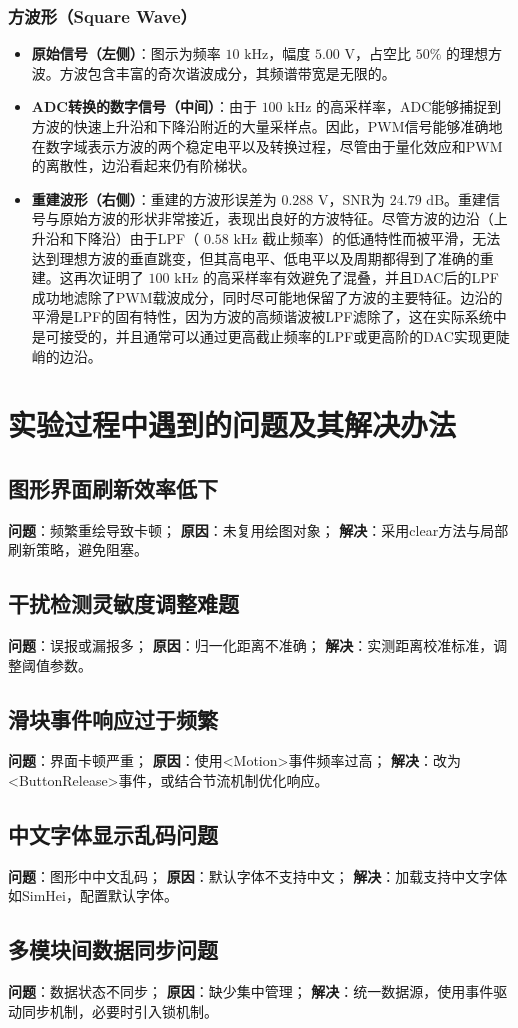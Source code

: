 \documentclass[12pt]{article}
\begin{document}
\subsubsection{方波形（Square Wave）}

\begin{itemize}
    \item \textbf{原始信号（左侧）}：图示为频率 $10 \text{ kHz}$，幅度 $5.00 \text{ V}$，占空比 $50\%$ 的理想方波。方波包含丰富的奇次谐波成分，其频谱带宽是无限的。
    \item \textbf{ADC转换的数字信号（中间）}：由于 $100 \text{ kHz}$ 的高采样率，ADC能够捕捉到方波的快速上升沿和下降沿附近的大量采样点。因此，PWM信号能够准确地在数字域表示方波的两个稳定电平以及转换过程，尽管由于量化效应和PWM的离散性，边沿看起来仍有阶梯状。
    \item \textbf{重建波形（右侧）}：重建的方波形误差为 $0.288 \text{ V}$，SNR为 $24.79 \text{ dB}$。重建信号与原始方波的形状非常接近，表现出良好的方波特征。尽管方波的边沿（上升沿和下降沿）由于LPF（ $0.58 \text{ kHz}$ 截止频率）的低通特性而被平滑，无法达到理想方波的垂直跳变，但其高电平、低电平以及周期都得到了准确的重建。这再次证明了 $100 \text{ kHz}$ 的高采样率有效避免了混叠，并且DAC后的LPF成功地滤除了PWM载波成分，同时尽可能地保留了方波的主要特征。边沿的平滑是LPF的固有特性，因为方波的高频谐波被LPF滤除了，这在实际系统中是可接受的，并且通常可以通过更高截止频率的LPF或更高阶的DAC实现更陡峭的边沿。
\end{itemize}

\section{实验过程中遇到的问题及其解决办法}

\subsection{图形界面刷新效率低下}
\textbf{问题}：频繁重绘导致卡顿；
\textbf{原因}：未复用绘图对象；
\textbf{解决}：采用clear方法与局部刷新策略，避免阻塞。

\subsection{干扰检测灵敏度调整难题}
\textbf{问题}：误报或漏报多；
\textbf{原因}：归一化距离不准确；
\textbf{解决}：实测距离校准标准，调整阈值参数。

\subsection{滑块事件响应过于频繁}
\textbf{问题}：界面卡顿严重；
\textbf{原因}：使用<Motion>事件频率过高；
\textbf{解决}：改为<ButtonRelease>事件，或结合节流机制优化响应。

\subsection{中文字体显示乱码问题}
\textbf{问题}：图形中中文乱码；
\textbf{原因}：默认字体不支持中文；
\textbf{解决}：加载支持中文字体如SimHei，配置默认字体。

\subsection{多模块间数据同步问题}
\textbf{问题}：数据状态不同步；
\textbf{原因}：缺少集中管理；
\textbf{解决}：统一数据源，使用事件驱动同步机制，必要时引入锁机制。
\end{document}
